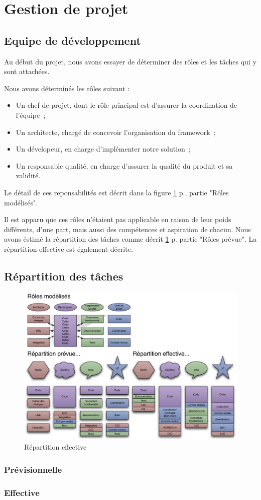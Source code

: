 \section{Gestion de projet}
\subsection{Equipe de développement}
Au début du projet, nous avons essayer de déterminer des rôles et les tâches qui y sont attachées.

Nous avons déterminés les rôles suivant :
\begin{itemize}
 \item Un chef de projet, dont le rôle principal est d'assurer la coordination de l'équipe~;
 \item Un architecte, chargé de concevoir l'organisation du framework~;
 \item Un dévelopeur, en charge d'implémenter notre solution~;
 \item Un responsable qualité, en charge d'assurer la qualité du produit et sa validité.
\end{itemize}
Le détail de ces reponsabilités est décrit dans la figure \ref{fig:repart_effect} p.\pageref{fig:repart_effect}, partie "Rôles modélisés".

Il est apparu que ces rôles n'étaient pas applicable en raison de leur poids différents, d'une part, mais aussi des compétences et aspiration de chacun. Nous avons éstimé la répartition des tâches comme décrit \ref{fig:repart_effect} p.\pageref{fig:repart_effect} partie "Rôles prévue".
La répartition effective est également décrite.

\subsection{Répartition des tâches}
\begin{figure}[thbp]
	\centering
		\includegraphics[angle=90, scale=0.7]{../diagrammes/repartition_taches.pdf}
	\caption{Répartition effective}
	\label{fig:repart_effect}
\end{figure}
\subsubsection{Prévisionnelle}

\subsubsection{Effective}